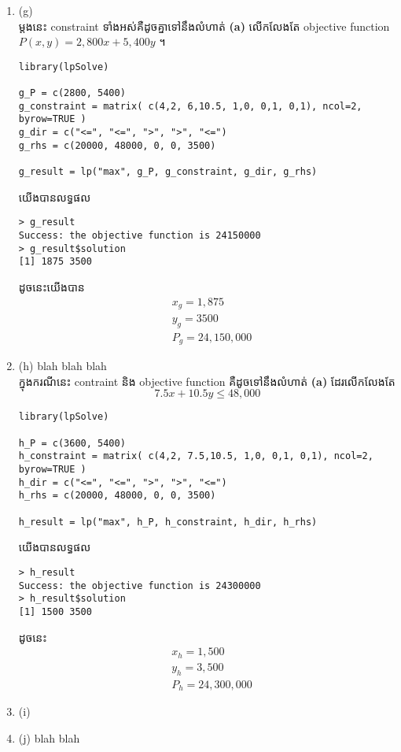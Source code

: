 \begin{enumerate}[label={\textbf{(\alph*)}}]
  
   
 \item (g)\\[1cm]
   ម្តងនេះ constraint ទាំងអស់គឺដូចគ្នាទៅនឹងលំហាត់ \textbf{(a)}
   លើកលែងតែ objective function
   $P(x,y)=2,800x+ 5,400y$ ។
   \begin{lstlisting}
library(lpSolve)

g_P = c(2800, 5400)
g_constraint = matrix( c(4,2, 6,10.5, 1,0, 0,1, 0,1), ncol=2, byrow=TRUE )
g_dir = c("<=", "<=", ">", ">", "<=")
g_rhs = c(20000, 48000, 0, 0, 3500)

g_result = lp("max", g_P, g_constraint, g_dir, g_rhs)
   \end{lstlisting}
   យើងបានលទ្ធផល
   \begin{verbatim}
> g_result 
Success: the objective function is 24150000 
> g_result$solution 
[1] 1875 3500
   \end{verbatim}
   ដូចនេះយើងបាន
   \begin{align*}
     &x_g = 1,875\\
     &y_g = 3500\\
     &P_g = 24,150,000 
   \end{align*}
   
 \item (h) blah blah blah \\[1cm]
   ក្នុងករណីនេះ contraint និង objective function
   គឺដូចទៅនឹងលំហាត់ \textbf{(a)} ដែរលើកលែងតែ
   \[7.5x+10.5y\leq 48,000\]
   \begin{lstlisting}
library(lpSolve)

h_P = c(3600, 5400)
h_constraint = matrix( c(4,2, 7.5,10.5, 1,0, 0,1, 0,1), ncol=2, byrow=TRUE )
h_dir = c("<=", "<=", ">", ">", "<=")
h_rhs = c(20000, 48000, 0, 0, 3500)

h_result = lp("max", h_P, h_constraint, h_dir, h_rhs)
   \end{lstlisting}
   យើងបានលទ្ធផល
   \begin{verbatim}
> h_result
Success: the objective function is 24300000 
> h_result$solution
[1] 1500 3500
   \end{verbatim}
   ដូចនេះ
   \begin{align*}
     &x_h = 1,500\\
     &y_h = 3,500\\
     &P_h = 24,300,000 
   \end{align*}

   
 \item (i)
 \item (j) blah blah 

  


\end{enumerate}




